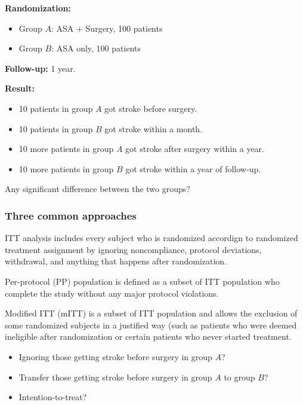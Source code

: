 \documentclass[table,10pt]{beamer}
\begin{document}
\begin{CJK*}{UTF8}{gbsn}
\begin{frame}[t]
\textbf{Randomization: }
\begin{itemize}
	\item Group $A$: ASA + Surgery, 100 patients
	\item Group $B$: ASA only, 100 patients
\end{itemize}

\textbf{Follow-up: }
1 year.

\textbf{Result: }
\begin{itemize}
	\item 10 patients in group $A$ got stroke before surgery.
	\item 10 patients in group $B$ got stroke within a month.
	\item 10 more patients in group $A$ got stroke after surgery within a year.
	\item 10 more patients in group $B$ got stroke within a year of follow-up.
\end{itemize}

\alert{Any significant difference between the two groups?}
\end{frame}


\begin{frame}[t]
\frametitle{Three common approaches}
\alert{ITT} analysis includes every subject who is randomized accordign to randomized 
treatment assignment by ignoring noncompliance, protocol deviations, withdrawal, 
and anything that happens after randomization.

\alert{Per-protocol (PP)} population is defined as a subset of ITT population who 
complete the study without any major protocol violations.

\alert{Modified ITT (mITT)} is a subset of ITT population and allows the exclusion 
of some randomized subjects in a justified way (such as patients who were deemed 
ineligible after randomization or certain patients who never started treatment.


\begin{itemize}
	\item<3-> Ignoring those getting stroke before surgery in group $A$?
	\item<4-> Transfer those getting stroke before surgery in group $A$ to group $B$?
	\item<5-> Intention-to-treat?
\end{itemize}
\end{frame}



\end{CJK*}
\end{document}
